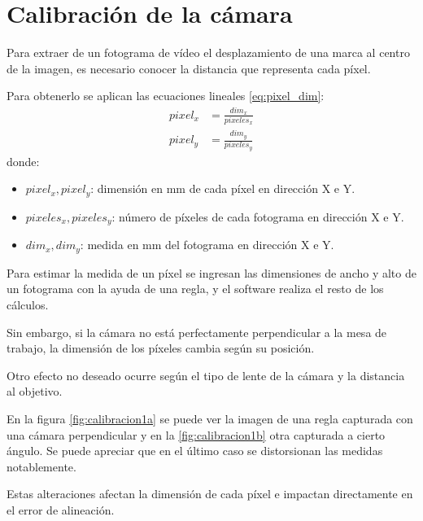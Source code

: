\section{Calibración de la cámara} 
   Para extraer de un fotograma de vídeo el desplazamiento de una marca al centro de la imagen, es necesario conocer la distancia que representa cada píxel.\par
   Para obtenerlo se aplican las ecuaciones lineales \ref{eq:pixel_dim}:
   \begin{equation}
      \begin{aligned}
         pixel_x&=\frac{dim_x}{pixeles_x} \\
         pixel_y&=\frac{dim_y}{pixeles_y}
      \end{aligned}
      \label{eq:pixel_dim}
   \end{equation}
donde:
\begin{itemize}
   \item{$pixel_x,pixel_y$: dimensión en mm de cada píxel en dirección X e Y.}
   \item{$pixeles_x, pixeles_y$: número de píxeles de cada fotograma en dirección X e Y.}
   \item{$dim_x, dim_y$: medida en mm del fotograma en dirección X e Y.}
\end{itemize}

Para estimar la medida de un píxel se ingresan las dimensiones de ancho y alto de un fotograma con la ayuda de una regla, y el software realiza el resto de los cálculos.\par

Sin embargo, si la cámara no está perfectamente perpendicular a la mesa de trabajo, la dimensión de los píxeles cambia según su posición.\par
Otro efecto no deseado ocurre según el tipo de lente de la cámara y la distancia al objetivo.\par

En la figura \ref{fig:calibracion1a} se puede ver la imagen de una regla capturada con una cámara perpendicular y en la \ref{fig:calibracion1b} otra capturada a cierto ángulo. Se puede apreciar que en el último caso se distorsionan las medidas notablemente.\par 

Estas alteraciones afectan la dimensión de cada píxel e impactan directamente en el error de alineación.\par


